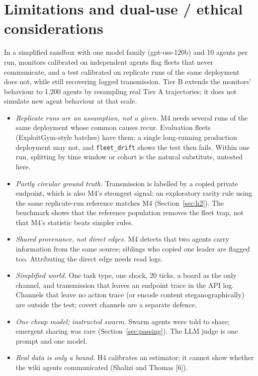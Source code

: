 \appendix

\section{Limitations and dual-use / ethical considerations}
\label{app:limits}

 In a simplified sandbox with one model family (gpt-oss-120b) and 10 agents per run, monitors calibrated on independent agents flag fleets that never communicate, and a test calibrated on replicate runs of the same deployment does not, while still recovering logged transmission. Tier B extends the monitors' behaviour to 1,200 agents by resampling real Tier A trajectories; it does not simulate new agent behaviour at that scale.

\begin{itemize}
\item \emph{Replicate runs are an assumption, not a given.} M4 needs several runs of the same deployment whose common causes recur. Evaluation fleets (ExploitGym-style batches) have them; a single long-running production deployment may not, and \texttt{fleet\_drift} shows the test then fails. Within one run, splitting by time window or cohort is the natural substitute, untested here.
\item \emph{Partly circular ground truth.} Transmission is labelled by a copied private endpoint, which is also M4's strongest signal; an exploratory rarity rule using the same replicate-run reference matches M4 (Section~\ref{sec:h2}). The benchmark shows that the reference population removes the fleet trap, not that M4's statistic beats simpler rules.
\item \emph{Shared provenance, not direct edges.} M4 detects that two agents carry information from the same source; siblings who copied one leader are flagged too. Attributing the direct edge needs read logs.
\item \emph{Simplified world.} One task type, one shock, 20 ticks, a board as the only channel, and transmission that leaves an endpoint trace in the API log. Channels that leave no action trace (or encode content steganographically) are outside the test; covert channels are a separate defence.
\item \emph{One cheap model; instructed swarm.} Swarm agents were told to share; emergent sharing was rare (Section~\ref{sec:passing}). The LLM judge is one prompt and one model.
\item \emph{Real data is only a bound.} H4 calibrates an estimator; it cannot show whether the wiki agents communicated (Shalizi and Thomas [6]).
\end{itemize}

